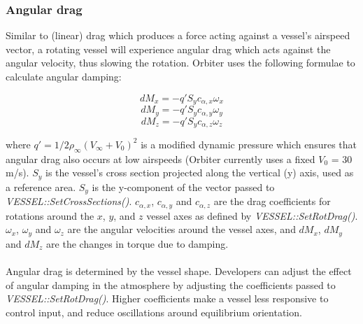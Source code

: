 \documentclass[Orbiter Developer Manual.tex]{subfiles}
\begin{document}
\subsubsection{Angular drag}
Similar to (linear) drag which produces a force acting against a vessel's airspeed vector, a rotating vessel will experience angular drag which acts against the angular velocity, thus slowing the rotation. Orbiter uses the following formulae to calculate angular damping:

\[ dM_{x} = -q'S_{y}c_{\alpha,x}\omega_{x} \]
\[ dM_{y} = -q'S_{y}c_{\alpha,y}\omega_{y} \]
\[ dM_{z} = -q'S_{y}c_{\alpha,z}\omega_{z} \]

\noindent
where $q' = 1/2 \rho_{\infty}(V_{\infty} + V_{0})^{2}$ is a modified dynamic pressure which ensures that angular drag also occurs at low airspeeds (Orbiter currently uses a fixed $V_{0}$ = 30 m/s). $S_{y}$ is the vessel's cross section projected along the vertical (y) axis, used as a reference area. $S_{y}$ is the y-component of the vector passed to \textit{VESSEL::SetCrossSections()}. $c_{\alpha,x}$, $c_{\alpha,y}$ and $c_{\alpha,z}$ are the drag coefficients for rotations around the $x$, $y$, and $z$ vessel axes as defined by \textit{VESSEL::SetRotDrag()}. $\omega_{x}$, $\omega_{y}$ and $\omega_{z}$ are the angular velocities around the vessel axes, and $dM_{x}$, $dM_{y}$ and $dM_{z}$ are the changes in torque due to damping.\\
\\
Angular drag is determined by the vessel shape. Developers can adjust the effect of angular damping in the atmosphere by adjusting the coefficients passed to \textit{VESSEL::SetRotDrag()}. Higher coefficients make a vessel less responsive to control input, and reduce oscillations around equilibrium orientation.
\end{document}
